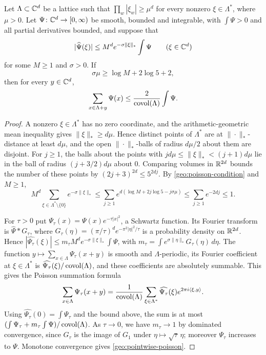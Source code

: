 \begin{lemma}\label{geo:poisson}
Let $\Lambda\subset\mathbb C^d$ be a lattice such that
$\prod_w|\xi_w|\ge\mu^d$ for every nonzero $\xi\in\Lambda^*$, where
$\mu>0$. Let $\Psi\colon\mathbb C^d\to[0,\infty)$ be smooth, bounded and
integrable, with $\int\Psi>0$ and all partial derivatives bounded, and
suppose that
\[
 |\widehat\Psi(\xi)|\le M^de^{-\sigma\|\xi\|_*}\int\Psi
 \qquad(\xi\in\mathbb C^d)
\]
for some $M\ge1$ and $\sigma>0$. If
\begin{equation}\label{geo:poisson-condition}
 \sigma\mu\ge\log M+2\log5+2,
\end{equation}
then for every $y\in\mathbb C^d$,
\begin{equation}\label{geo:pointwise-poisson}
 \sum_{x\in\Lambda+y}\Psi(x)\le\frac2{\operatorname{covol}(\Lambda)}\int\Psi.
\end{equation}
\end{lemma}

\begin{proof}
A nonzero $\xi\in\Lambda^*$ has no zero coordinate, and the
arithmetic-geometric mean inequality gives $\|\xi\|_*\ge d\mu$. Hence
distinct points of $\Lambda^*$ are at $\|\cdot\|_*$-distance at least
$d\mu$, and the open $\|\cdot\|_*$-balls of radius $d\mu/2$ about them
are disjoint. For $j\ge1$, the balls about the points with
$jd\mu\le\|\xi\|_*<(j+1)d\mu$ lie in the ball of radius $(j+3/2)d\mu$
about $0$. Comparing volumes in $\mathbb R^{2d}$ bounds the number of these
points by $(2j+3)^{2d}\le5^{2dj}$. By \eqref{geo:poisson-condition} and
$M\ge1$,
\[
 M^d\sum_{\xi\in\Lambda^*\setminus\{0\}}e^{-\sigma\|\xi\|_*}
 \le\sum_{j\ge1}e^{d(\log M+2j\log5-j\sigma\mu)}
 \le\sum_{j\ge1}e^{-2dj}\le1 .
\]

For $\tau>0$ put $\Psi_\tau(x)=\Psi(x)e^{-\tau|x|^2}$, a Schwartz
function. Its Fourier transform is $\widehat\Psi*G_\tau$, where
$G_\tau(\eta)=(\pi/\tau)^de^{-\pi^2|\eta|^2/\tau}$ is a probability
density on $\mathbb R^{2d}$. Hence
$|\widehat{\Psi_\tau}(\xi)|\le m_\tau M^de^{-\sigma\|\xi\|_*}\int\Psi$,
with $m_\tau=\int e^{\sigma\|\eta\|_*}G_\tau(\eta)\,d\eta$. The function
$y\mapsto\sum_{x\in\Lambda}\Psi_\tau(x+y)$ is smooth and
$\Lambda$-periodic, its Fourier coefficient at $\xi\in\Lambda^*$ is
$\widehat{\Psi_\tau}(\xi)/\operatorname{covol}(\Lambda)$, and these coefficients are
absolutely summable. This gives the Poisson summation formula
\[
 \sum_{x\in\Lambda}\Psi_\tau(x+y)
 =\frac1{\operatorname{covol}(\Lambda)}\sum_{\xi\in\Lambda^*}\widehat{\Psi_\tau}(\xi)
 e^{2\pi i\langle\xi,y\rangle}.
\]
Using $\widehat{\Psi_\tau}(0)=\int\Psi_\tau$ and the bound above, the sum
is at most $(\int\Psi_\tau+m_\tau\int\Psi)/\operatorname{covol}(\Lambda)$. As
$\tau\to0$, we have $m_\tau\to1$ by dominated convergence, since
$G_\tau$ is the image of $G_1$ under $\eta\mapsto\sqrt\tau\,\eta$;
moreover $\Psi_\tau$ increases to $\Psi$. Monotone convergence gives
\eqref{geo:pointwise-poisson}.
\end{proof}

